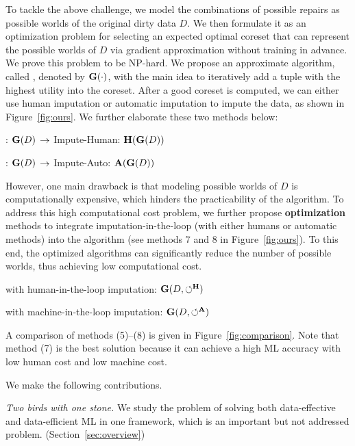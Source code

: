 To tackle the above challenge, we model the combinations of possible repairs as possible worlds of the original dirty data $D$. 
We then formulate it as an optimization problem for selecting an expected optimal coreset that can represent the  possible worlds of $D$ via gradient approximation without training in advance. We prove this problem to be NP-hard. We propose an approximate algorithm, called \ours, denoted by $\mathbf{G}(\cdot)$, with the main idea to iteratively add a tuple with the highest utility  into the coreset. 
After a good coreset is computed, we can either use human imputation or automatic imputation to impute the data, as shown in Figure~\ref{fig:ours}.
We further elaborate these two methods below:

\bi
	\item[(5)] \ours: $\mathbf{G}(D)$ $\rightarrow$ Impute-Human: $\mathbf{H}(\mathbf{G}(D))$
	\item[(6)] \ours: $\mathbf{G}(D)$ $\rightarrow$ Impute-Auto: $\mathbf{A}(\mathbf{G}(D))$
\ei

However, one main drawback is that modeling possible worlds of $D$ is computationally expensive, which hinders the practicability of the \ours algorithm.  To address this high computational cost problem, we further propose {\bf optimization} methods to integrate imputation-in-the-loop (with either humans or automatic methods) into the \ours algorithm (see methods 7 and 8 in Figure~\ref{fig:ours}). To this end, the optimized algorithms can significantly reduce the number of possible worlds, thus achieving low computational cost. 

\bi
	\item[(7)] \ours with human-in-the-loop imputation: $\mathbf{G}(D, \circlearrowleft^\mathbf{H})$ 
	\item[(8)] \ours with machine-in-the-loop imputation: $\mathbf{G}(D, \circlearrowleft^\mathbf{A})$
\ei


A comparison of methods (5)--(8) is given in Figure~\ref{fig:comparison}. Note that method (7) is the best solution because it can achieve a high ML accuracy with low human cost and low machine cost. 


We make the following contributions.

\be
	\item[(i)] \textit{Two birds with one stone.} 
	We study the problem of solving both data-effective and data-efficient ML in one framework, which is an important but not addressed problem.
 	(Section~\ref{sec:overview})

